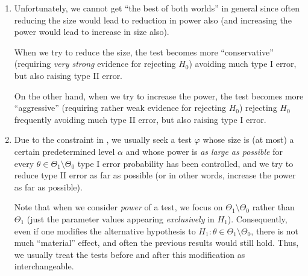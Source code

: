 \begin{enumerate}
\item \label{it:size-power-inverse-relate}
Unfortunately, we cannot get ``the best of both worlds'' in general since often
reducing the size would lead to reduction in power also (and increasing the
power would lead to increase in size also).

\begin{intuition}
When we try to reduce the size, the test becomes more ``conservative''
(requiring \emph{very strong} evidence for rejecting \(H_0\))
 avoiding much type I error, but also raising type
II error.

On the other hand, when we try to increase the power, the test becomes more
``aggressive'' (requiring rather weak evidence for rejecting \(H_0\))
 rejecting \(H_0\) frequently  avoiding
much type II error, but also raising type I error.
\end{intuition}

\item \label{it:good-test-goal}
Due to the constraint in , we
usually seek a test \(\varphi\) whose size is (at most) a certain predetermined
level \(\alpha\) and whose power is \emph{as large as possible} for every
\(\theta\in\Theta_1\setminus\Theta_0\)  type I error
probability has been controlled, and we try to reduce type II error as far as
possible (or in other words, increase the power as far as possible).

\begin{note}
Note that when we consider \emph{power} of a test, we focus on
\(\Theta_1\setminus\Theta_0\) rather than \(\Theta_1\) (just the parameter
values appearing \emph{exclusively} in \(H_1\)). Consequently, even if one
modifies the alternative hypothesis to
\(H_1:\theta\in\Theta_1\setminus\Theta_0\), there is not much ``material''
effect, and often the previous results would still hold. Thus, we usually treat
the tests before and after this modification as interchangeable.
\end{note}
\end{enumerate}
